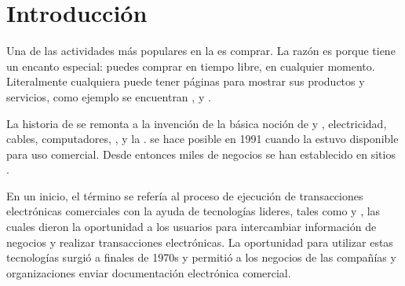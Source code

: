 \chapter{Introducción}\label{cap:intro}


		Una de las actividades más populares en la \webINT es comprar. La razón es porque tiene un encanto especial: puedes comprar en tiempo libre, en cualquier momento. Literalmente cualquiera puede tener páginas para mostrar sus productos y servicios, como ejemplo se encuentran \amazonNAME \cite{online_amazon_official}, \ebayNAME \cite{online_ebay_official} y \bestBuyNAME \cite{online_bestbuy_official}.

		La historia de \ecommerceCOM se remonta a la invención de la básica noción de \buyingCOM y \sellingCOM, electricidad, cables, computadores, \modems, y la \internetINT. \ecommerceCOM se hace posible en 1991 cuando la \internetINT estuvo disponible para uso comercial. Desde entonces miles de negocios se han establecido en sitios \webINT.

		En un inicio, el término \ecommerceCOM se refería al proceso de ejecución  de transacciones electrónicas comerciales con la ayuda de tecnologías lideres, tales como \electDataInterCOM y \electFundsTransCOM, las cuales dieron la oportunidad a los usuarios para intercambiar información de negocios y realizar transacciones electrónicas. La oportunidad para utilizar estas tecnologías surgió a finales de 1970s \cite{online_history_ecommerce} y permitió a los negocios de las compañías y organizaciones enviar documentación electrónica comercial.

